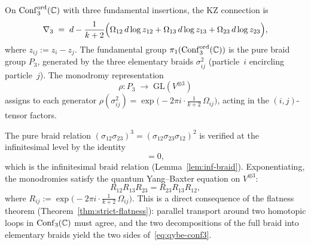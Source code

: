 \begin{computation}
On $\mathrm{Conf}_3^{\mathrm{ord}}(\mathbb C)$ with three fundamental insertions, the KZ connection is
\[
 \nabla_3 \;=\; d - \frac{1}{k+2}\Bigl(
 \Omega_{12}\,d\log z_{12}+\Omega_{13}\,d\log z_{13}+\Omega_{23}\,d\log z_{23}
 \Bigr),
\]
where $z_{ij}:=z_i-z_j$. The fundamental group
$\pi_1(\mathrm{Conf}_3^{\mathrm{ord}}(\mathbb C))$ is the pure braid group $P_3$,
generated by the three elementary braids $\sigma_{ij}^2$
(particle~$i$ encircling particle~$j$). The monodromy representation
\[
 \rho\colon P_3\;\longrightarrow\; \mathrm{GL}(V^{\otimes 3})
\]
assigns to each generator
$\rho(\sigma_{ij}^2) = \exp\!\bigl(-2\pi i\cdot\tfrac{1}{k+2}\,\Omega_{ij}\bigr)$,
acting in the $(i,j)$-tensor factors.

The pure braid relation $(\sigma_{12}\sigma_{23})^3=(\sigma_{12}\sigma_{23}\sigma_{12})^2$
is verified at the infinitesimal level by the identity
\begin{equation}%
 [\Omega_{12},\Omega_{13}+\Omega_{23}]=0,
\end{equation}
which is the infinitesimal braid relation (Lemma~\ref{lem:inf-braid}).
Exponentiating, the monodromies satisfy the quantum Yang--Baxter equation
on $V^{\otimes 3}$:
\begin{equation}%
 R_{12}R_{13}R_{23}=R_{23}R_{13}R_{12},
\end{equation}
where $R_{ij}:=\exp\!\bigl(-2\pi i\cdot\frac{1}{k+2}\,\Omega_{ij}\bigr)$.
This is a direct consequence of the flatness theorem
(Theorem~\ref{thm:strict-flatness}): parallel transport around two
homotopic loops in $\mathrm{Conf}_3(\mathbb C)$ must agree, and the two decompositions
of the full braid into elementary braids yield the two sides
of~\eqref{eq:qybe-conf3}.
\end{computation}

